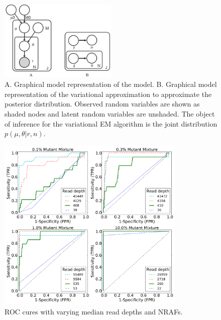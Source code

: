 \documentclass{bmcart}
\begin{document}
\begin{backmatter}
\clearpage
\begin{figure}[htpb]
\begin{center}
\includegraphics[width=0.5\textwidth]{rvd3.png}
\caption{ A. Graphical model representation of the model.
B. Graphical model representation of the variational approximation  to approximate the posterior distribution.
Observed random variables are shown as shaded nodes and latent random variables are unshaded.
The object of inference for the variational EM algorithm is the joint distribution $p(\mu, \theta|r, n)$.}
\end{center}
\end{figure}


\clearpage
\begin{figure}[htbp]
\centering
\includegraphics[width=0.8\textwidth]{ROC_without_chi2.pdf}
\caption{ROC cures with varying median read depths and NRAFs.}%
\end{figure}





\end{backmatter}
\end{document}
